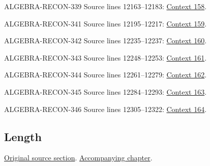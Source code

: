 \begin{AlgebraSourceRoutes}
\item[ALGEBRA-RECON-339] Source lines 12163--12183: \hyperlink{algebra-context-158}{Context 158}.
\item[ALGEBRA-RECON-341] Source lines 12195--12217: \hyperlink{algebra-context-159}{Context 159}.
\item[ALGEBRA-RECON-342] Source lines 12235--12237: \hyperlink{algebra-context-160}{Context 160}.
\item[ALGEBRA-RECON-343] Source lines 12248--12253: \hyperlink{algebra-context-161}{Context 161}.
\item[ALGEBRA-RECON-344] Source lines 12261--12279: \hyperlink{algebra-context-162}{Context 162}.
\item[ALGEBRA-RECON-345] Source lines 12284--12293: \hyperlink{algebra-context-163}{Context 163}.
\item[ALGEBRA-RECON-346] Source lines 12305--12322: \hyperlink{algebra-context-164}{Context 164}.
\end{AlgebraSourceRoutes}

\subsection{Length}
\hypertarget{algebra-source-section-length}{}
\noindent\href{https://github.com/stacks/stacks-project/blob/a04446e57ec1fbc252a871afcec7752fb2807b14/algebra.tex\#L12346}{Original source section}. \href{algebra.pdf\#nameddest=section-length}{Accompanying chapter}.

